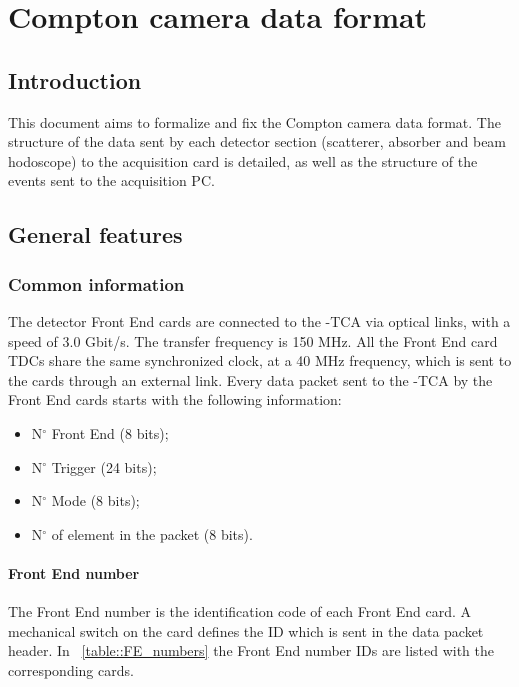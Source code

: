 \chapter{Compton camera data format}

\section{Introduction}

This document aims to formalize and fix the Compton camera data format. The structure of the data sent by each detector section (scatterer, absorber and beam hodoscope) to the acquisition card is detailed, as well as the structure of the events sent to the acquisition PC.


\section{General features}


\subsection{Common information}

The detector Front End cards are connected to the \charmu-TCA via optical links, with a speed of 3.0 Gbit/s. The transfer frequency is 150 MHz.\newline
All the Front End card TDCs share the same synchronized clock, at a 40 MHz frequency, which is sent to the cards through an external link.\newline
Every data packet sent to the \charmu-TCA by the Front End cards starts with the following information:
\begin{itemize}
	\item N$^{\circ}$ Front End (8 bits);
	\item N$^{\circ}$ Trigger (24 bits);
	\item N$^{\circ}$ Mode (8 bits);
	\item N$^{\circ}$ of element in the packet (8 bits).
\end{itemize}

\subsubsection{Front End number\newline}

The Front End number is the identification code of each Front End card. A mechanical switch on the card defines the ID which is sent in the data packet header.
\newline
In \tablename~\ref{table::FE_numbers} the Front End number IDs are listed with the corresponding cards.

